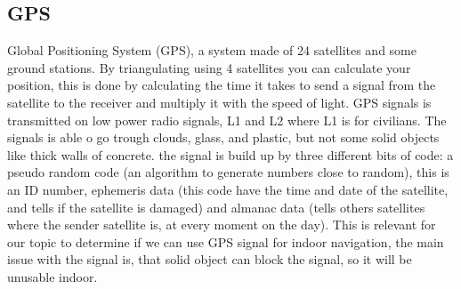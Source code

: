 
\subsection{GPS}
Global Positioning System (GPS), a system made of 24 satellites and some ground stations. By triangulating using 4 satellites you can calculate your position, this is done by calculating the time it takes to send a signal from the satellite to the receiver and multiply it with the speed of light. GPS signals is transmitted on low power radio signals, L1 and L2 where L1 is for civilians. The signals is able o go trough clouds, glass, and plastic, but not some solid objects like thick walls of concrete. the signal is build up by three different bits of code: a pseudo random code (an algorithm to generate numbers close to random)\cite{GPS_random}, this is an ID number, ephemeris data (this code have the time and date of the satellite, and tells if the satellite is damaged) and almanac data (tells others satellites where the sender satellite is, at every moment on the day)\cite{GPS_about,GPS_text}. This is relevant for our topic to determine if we  can use GPS signal for indoor navigation, the main issue with the signal is, that solid object can block the signal, so it will be unusable indoor.

